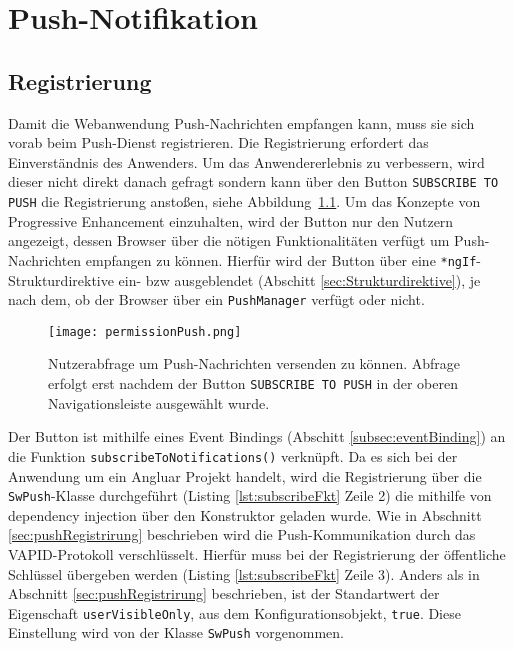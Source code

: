 \chapter{Push-Notifikation}\label{ch:PushNotifikation}

\section{Registrierung}

Damit die Webanwendung Push-Nachrichten empfangen kann, muss sie sich vorab beim Push-Dienst registrieren. Die Registrierung erfordert das Einverständnis des Anwenders. 
Um das Anwendererlebnis zu verbessern, wird dieser nicht direkt danach gefragt sondern kann über den Button \texttt{SUBSCRIBE TO PUSH} die Registrierung anstoßen, siehe Abbildung~\ref{img:permissionPush}. Um das Konzepte von Progressive Enhancement einzuhalten, wird der Button nur den Nutzern angezeigt, dessen Browser über die nötigen Funktionalitäten verfügt um Push-Nachrichten empfangen zu können. Hierfür wird der Button über eine \texttt{*ngIf}-Strukturdirektive ein- bzw ausgeblendet (Abschitt \ref{sec:Strukturdirektive}), je nach dem, ob der Browser über ein \texttt{PushManager} verfügt oder nicht. 

\begin{figure}[!htb]
    \centering
    \texttt{[image: permissionPush.png]}
    \caption{Nutzerabfrage um Push-Nachrichten versenden zu können. Abfrage erfolgt erst nachdem der Button \texttt{SUBSCRIBE TO PUSH} in der oberen Navigationsleiste ausgewählt wurde.}
    \label{img:permissionPush}
\end{figure}

Der Button ist mithilfe eines Event Bindings (Abschitt \ref{subsec:eventBinding}) an die Funktion \linebreak\texttt{subscribeToNotifications()} verknüpft. Da es sich bei der Anwendung um ein Angluar Projekt handelt, 
wird die Registrierung über die \texttt{SwPush}-Klasse durchgeführt (Listing \ref{lst:subscribeFkt} Zeile 2) die mithilfe von dependency injection über den Konstruktor geladen wurde. Wie in Abschnitt \ref{sec:pushRegistrirung} beschrieben wird die Push-Kommunikation durch das VAPID-Protokoll verschlüsselt. Hierfür muss bei der Registrierung der öffentliche Schlüssel übergeben werden (Listing \ref{lst:subscribeFkt} Zeile 3). Anders als in Abschnitt \ref{sec:pushRegistrirung} beschrieben, ist der Standartwert der Eigenschaft \texttt{userVisibleOnly}, aus dem Konfigurationsobjekt, \texttt{true}. Diese Einstellung wird von der Klasse \texttt{SwPush} vorgenommen. 

